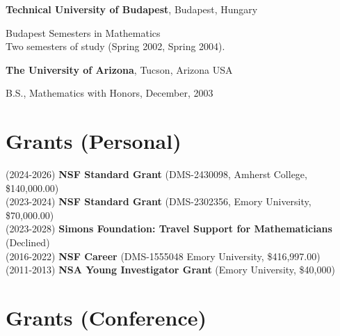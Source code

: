 \documentclass[margin,line]{res}
\newenvironment{list1}{
  \begin{list}{\ding{113}}{%
      \setlength{\itemsep}{0in}
      \setlength{\parsep}{0in} \setlength{\parskip}{0in}
      \setlength{\topsep}{0in} \setlength{\partopsep}{0in}
      \setlength{\leftmargin}{0.17in}}}{\end{list}}
\begin{document}
\begin{resume}
 {\bf Technical University of Budapest}, Budapest, Hungary\\
  \vspace*{-.15in}
  \begin{list1}
  \item[] Budapest Semesters in Mathematics\\
    Two semesters of study (Spring 2002, Spring 2004).
  \end{list1}
\vspace{-7pt}

{\bf The University of Arizona}, Tucson, Arizona USA\\
  \vspace*{-.15in}
  \begin{list1}
  \item[] B.S., Mathematics with Honors, December, 2003\\
  \end{list1}

\vspace{-7pt}
\section{\sc Grants  {(Personal)}}

(2024-2026) \textbf{NSF Standard Grant} (DMS-2430098, Amherst College, \$140,000.00) \\
(2023-2024) \textbf{NSF Standard Grant} (DMS-2302356, Emory University, \$70,000.00) \\
(2023-2028) \textbf{Simons Foundation: Travel Support for Mathematicians} (Declined) \\
(2016-2022) \textbf{NSF Career} (DMS-1555048 Emory University, \$416,997.00) \\
(2011-2013) \textbf{NSA Young Investigator Grant} (Emory University, \$40,000)\\

\vspace{-7pt}
\section{\sc Grants {(Conference)}}


\end{resume}
\end{document}
